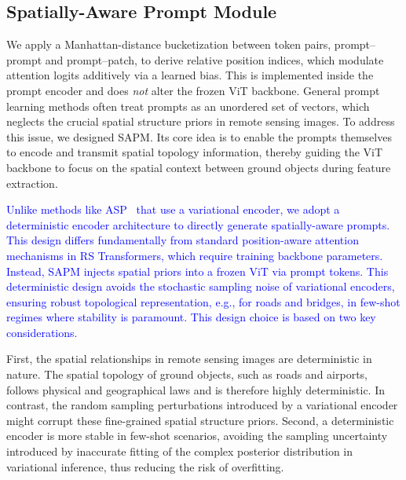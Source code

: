 ﻿\documentclass[letterpaper,journal]{IEEEtran}
\begin{document}
\subsection{Spatially-Aware Prompt Module}

We apply a Manhattan-distance bucketization between token pairs, prompt--prompt and prompt--patch, to derive relative position indices, which modulate attention logits additively via a learned bias. This is implemented inside the prompt encoder and does \emph{not} alter the frozen ViT backbone.
General prompt learning methods often treat prompts as an unordered set of vectors, which neglects the crucial spatial structure priors in remote sensing images. To address this issue, we designed SAPM. Its core idea is to enable the prompts themselves to encode and transmit spatial topology information, thereby guiding the ViT backbone to focus on the spatial context between ground objects during feature extraction. 

\textcolor{blue}{
Unlike methods like ASP~\cite{liu2024} that use a variational encoder, we adopt a deterministic encoder architecture to directly generate spatially-aware prompts. This design differs fundamentally from standard position-aware attention mechanisms in RS Transformers, which require training backbone parameters. Instead, SAPM injects spatial priors into a frozen ViT via prompt tokens. This deterministic design avoids the stochastic sampling noise of variational encoders, ensuring robust topological representation, e.g., for roads and bridges, in few-shot regimes where stability is paramount. This design choice is based on two key considerations. }

First, the spatial relationships in remote sensing images are deterministic in nature. The spatial topology of ground objects, such as roads and airports, follows physical and geographical laws and is therefore highly deterministic. In contrast, the random sampling perturbations introduced by a variational encoder might corrupt these fine-grained spatial structure priors. Second, a deterministic encoder is more stable in few-shot scenarios, avoiding the sampling uncertainty introduced by inaccurate fitting of the complex posterior distribution in variational inference, thus reducing the risk of overfitting.
\end{document}
